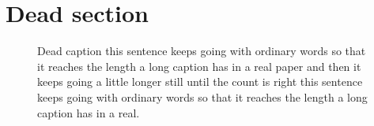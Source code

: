 \section{Dead section}
\begin{figure}[t]
\centering
{}
\caption{Dead caption this sentence keeps going with ordinary words so that it reaches the length a long caption has in a real paper and then it keeps going a little longer still until the count is right this sentence keeps going with ordinary words so that it reaches the length a long caption has in a real.}
\end{figure}
